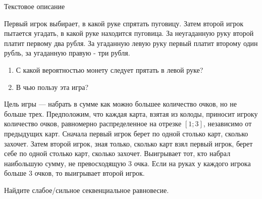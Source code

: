 \begin{problem} 
 Текстовое описание \par
Первый игрок выбирает, в какой руке спрятать пуговицу. Затем второй
игрок пытается угадать, в какой руке находится пуговица. За
неугаданную руку второй платит первому два рубля. За угаданную
левую руку первый платит второму один рубль, за угаданную правую -
три рубля. \par
\begin{enumerate}
\item С какой вероятностью монету следует прятать в левой руке? \par
\item В чью пользу эта игра? \par
\end{enumerate}


\begin{sol}

\end{sol}
\end{problem}




\begin{problem}
\begin{source}
\cite{lones:dtc}
\end{source}
Цель игры --- набрать в сумме как можно большее количество очков, но не больше трех. Предположим, что каждая карта, взятая из колоды, приносит игроку количество очков, равномерно распределенное на отрезке $[1;3]$, независимо от предыдущих карт. Сначала первый игрок берет по одной столько карт, сколько захочет. Затем второй игрок, зная только, сколько карт взял первый игрок, берет себе по одной столько карт, сколько захочет. Выигрывает тот, кто набрал наибольшую сумму, не превосходящую 3 очка. Если на руках у каждого игрока больше 3 очков, то выигрывает второй игрок. \par
Найдите слабое/сильное секвенциальное равновесие.





\begin{sol}

\end{sol}
\end{problem}



